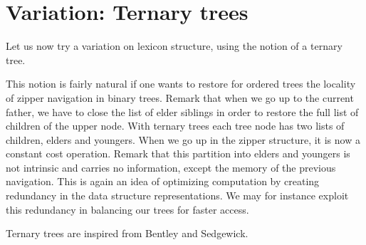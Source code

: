 \section{Variation: Ternary trees}

Let us now try a variation on lexicon structure, using the notion of a
ternary tree.

This notion is fairly natural if one wants to restore for ordered trees
the locality of zipper navigation in binary trees. Remark that when we
go up to the current father, we have to close the list of elder siblings
in order to restore the full list of children of the upper node.
With ternary trees each tree node has two lists of children, elders and 
youngers. When we go up in the zipper structure, it is now a constant
cost operation. Remark that this partition into elders and youngers is
not intrinsic and carries no information, except the memory of the previous
navigation. This is again an idea of optimizing computation by
creating redundancy in the data structure representations. We may for instance 
exploit this redundancy in balancing our trees for faster access. 

Ternary trees are inspired from Bentley and Sedgewick\cite{bentley}.

